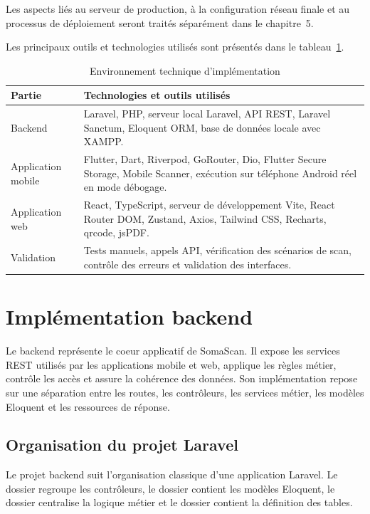 Les aspects liés au serveur de production, à la configuration réseau finale et au processus de déploiement seront traités séparément dans le chapitre~5.

Les principaux outils et technologies utilisés sont présentés dans le tableau~\ref{tab:outils-implementation}.

\begin{table}[H]
\centering
\begin{tabularx}{\textwidth}{|p{4cm}|X|}
\hline
\textbf{Partie} & \textbf{Technologies et outils utilisés} \\
\hline
Backend & Laravel, PHP, serveur local Laravel, API REST, Laravel Sanctum, Eloquent ORM, base de données locale avec XAMPP. \\
\hline
Application mobile & Flutter, Dart, Riverpod, GoRouter, Dio, Flutter Secure Storage, Mobile Scanner, exécution sur téléphone Android réel en mode débogage. \\
\hline
Application web & React, TypeScript, serveur de développement Vite, React Router DOM, Zustand, Axios, Tailwind CSS, Recharts, qrcode, jsPDF. \\
\hline
Validation & Tests manuels, appels API, vérification des scénarios de scan, contrôle des erreurs et validation des interfaces. \\
\hline
\end{tabularx}
\caption{Environnement technique d'implémentation}
\label{tab:outils-implementation}
\end{table}

\section{Implémentation backend}

Le backend représente le coeur applicatif de SomaScan. Il expose les services REST utilisés par les applications mobile et web, applique les règles métier, contrôle les accès et assure la cohérence des données. Son implémentation repose sur une séparation entre les routes, les contrôleurs, les services métier, les modèles Eloquent et les ressources de réponse.

\subsection*{Organisation du projet Laravel}

Le projet backend suit l'organisation classique d'une application Laravel. Le dossier  regroupe les contrôleurs, le dossier  contient les modèles Eloquent, le dossier  centralise la logique métier et le dossier  contient la définition des tables.

